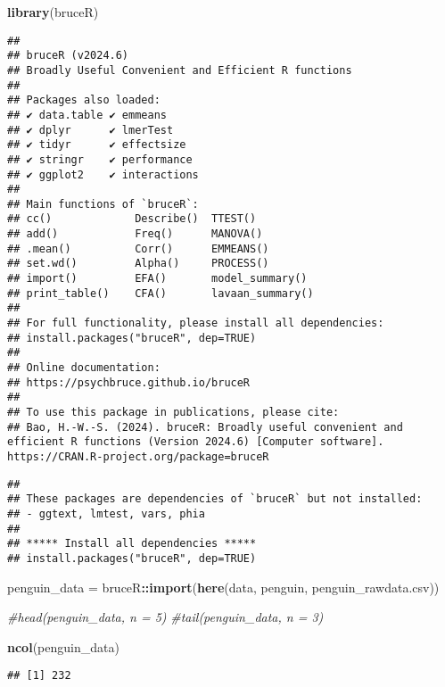 \documentclass[
]{article}
\newenvironment{Shaded}{\begin{snugshade}}{\end{snugshade}}
\newcommand{\CommentTok}[1]{\textcolor[rgb]{0.56,0.35,0.01}{\textit{#1}}}
\newcommand{\FunctionTok}[1]{\textcolor[rgb]{0.13,0.29,0.53}{\textbf{#1}}}
\newcommand{\NormalTok}[1]{#1}
\newcommand{\OtherTok}[1]{\textcolor[rgb]{0.56,0.35,0.01}{#1}}
\newcommand{\SpecialCharTok}[1]{\textcolor[rgb]{0.81,0.36,0.00}{\textbf{#1}}}
\newcommand{\StringTok}[1]{\textcolor[rgb]{0.31,0.60,0.02}{#1}}
\begin{document}
\begin{Shaded}
\begin{Highlighting}[]
\FunctionTok{library}\NormalTok{(bruceR)}
\end{Highlighting}
\end{Shaded}

\begin{verbatim}
## 
## bruceR (v2024.6)
## Broadly Useful Convenient and Efficient R functions
## 
## Packages also loaded:
## ✔ data.table ✔ emmeans
## ✔ dplyr      ✔ lmerTest
## ✔ tidyr      ✔ effectsize
## ✔ stringr    ✔ performance
## ✔ ggplot2    ✔ interactions
## 
## Main functions of `bruceR`:
## cc()             Describe()  TTEST()
## add()            Freq()      MANOVA()
## .mean()          Corr()      EMMEANS()
## set.wd()         Alpha()     PROCESS()
## import()         EFA()       model_summary()
## print_table()    CFA()       lavaan_summary()
## 
## For full functionality, please install all dependencies:
## install.packages("bruceR", dep=TRUE)
## 
## Online documentation:
## https://psychbruce.github.io/bruceR
## 
## To use this package in publications, please cite:
## Bao, H.-W.-S. (2024). bruceR: Broadly useful convenient and efficient R functions (Version 2024.6) [Computer software]. https://CRAN.R-project.org/package=bruceR
\end{verbatim}

\begin{verbatim}
## 
## These packages are dependencies of `bruceR` but not installed:
## - ggtext, lmtest, vars, phia
## 
## ***** Install all dependencies *****
## install.packages("bruceR", dep=TRUE)
\end{verbatim}

\begin{Shaded}
\begin{Highlighting}[]
\NormalTok{penguin\_data }\OtherTok{=}\NormalTok{ bruceR}\SpecialCharTok{::}\FunctionTok{import}\NormalTok{(}\FunctionTok{here}\NormalTok{(}\StringTok{\textquotesingle{}data\textquotesingle{}}\NormalTok{, }\StringTok{\textquotesingle{}penguin\textquotesingle{}}\NormalTok{, }\StringTok{\textquotesingle{}penguin\_rawdata.csv\textquotesingle{}}\NormalTok{))}

\CommentTok{\#head(penguin\_data, n = 5)}
\CommentTok{\#tail(penguin\_data, n = 3)}

\FunctionTok{ncol}\NormalTok{(penguin\_data)}
\end{Highlighting}
\end{Shaded}

\begin{verbatim}
## [1] 232
\end{verbatim}
\end{document}
